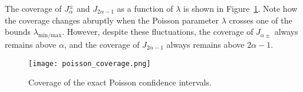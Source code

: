 \documentclass[11pt]{article}
\begin{document}
The coverage of $J^{\pm}_{\alpha}$ and $J_{2\alpha - 1}$ as a function of
$\lambda$ is shown in Figure~\ref{fig:poisson_coverage}. Note how the coverage
changes abruptly when the Poisson parameter $\lambda$ crosses one of the bounds
$\lambda_{\mathrm{min}/\mathrm{max}}$. However, despite these fluctuations, the
coverage of $J_{\alpha \pm}$ always remains above $\alpha$, and the coverage of
$J_{2\alpha - 1}$ always remains above $2\alpha - 1$.

\begin{figure}
\begin{center}
    \texttt{[image: poisson\_coverage.png]}
\end{center}
\caption{\label{fig:poisson_coverage}Coverage of the exact Poisson confidence
intervals.}
\end{figure}
\end{document}
